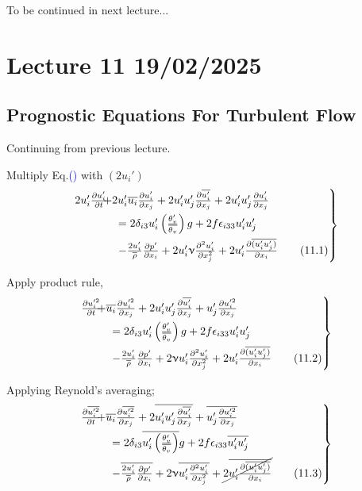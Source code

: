 \documentclass[fleqn,10pt]{SelfArx} %
\newcommand{\myeqref}[1]{Eq.\textcolor{blue}{\textup{(\getrefnumber{#1})}}}
\begin{document}
To be continued in next lecture...

\clearpage

\section{Lecture 11 19/02/2025}
\subsection{Prognostic Equations For Turbulent Flow}
Continuing from previous lecture.

Multiply \myeqref{eq:10.3} with \( (2u_i') \)
\begin{align*}
	\begin{rcases}
		2u_i'\frac{\partial u_i'}{\partial t} & \!\!\!\!\!\!\!\! + 2u_i'\overline{u_i}\frac{\partial u_i'}{\partial x_j} + 2u_i'u_j'\frac{\partial \overline{u_i'}}{\partial x_j} + 2u_i'u_j'\frac{\partial u_i'}{\partial x_j} \\ &= 2\delta_{i3}u_i'\left(\frac{\theta_v'}{\overline{\theta_v}}\right)g + 2f\epsilon_{i33}u_i'u_j' \\ &- \frac{2u_i'}{\overline{\rho}}\frac{\partial p'}{\partial x_i} + 2u_i'\upnu\frac{\partial^2 u_i'}{\partial x_j^2} + 2u_i'\frac{\partial \overline{(u_i'u_j')}}{\partial x_i} \tag{11.1} \label{eq:11.1}
	\end{rcases}
\end{align*}

Apply product rule,
\begin{align*}
	\begin{rcases}
		\frac{\partial u_i'^2}{\partial t} & \!\!\!\!\!\!\!\! + \overline{u_i}\frac{\partial u_i'^2}{\partial x_j} + 2u_i'u_j'\frac{\partial \overline{u_i'}}{\partial x_j} + u_j'\frac{\partial u_i'^2}{\partial x_j} \\ &= 2\delta_{i3}u_i'\left(\frac{\theta_v'}{\overline{\theta_v}}\right)g + 2f\epsilon_{i33}u_i'u_j' \\ &- \frac{2u_i'}{\overline{\rho}}\frac{\partial p'}{\partial x_i} + 2\upnu u_i'\frac{\partial^2 u_i'}{\partial x_j^2} + 2u_i'\frac{\partial \overline{(u_i'u_j')}}{\partial x_i} \tag{11.2} \label{eq:11.2}
	\end{rcases}
\end{align*}

Applying Reynold's averaging;
\begin{align*}
	\begin{rcases}
		\frac{\partial \overline{u_i'^2}}{\partial t} & \!\!\!\!\!\!\!\! + \overline{u_i}\frac{\partial \overline{u_i'^2}}{\partial x_j} + 2\overline{u_i'u_j'\frac{\partial \overline{u_i'}}{\partial x_j}} + \overline{u_j'\frac{\partial u_i'^2}{\partial x_j}} \\ &= 2\delta_{i3}\overline{u_i'\left(\frac{\theta_v'}{\overline{\theta_v}}\right)}g + 2f\epsilon_{i33}\overline{u_i'u_j'} \\ &- \overline{\frac{2u_i'}{\overline{\rho}}\frac{\partial p'}{\partial x_i}} + 2\upnu \overline{u_i'\frac{\partial^2 u_i'}{\partial x_j^2}} + \cancel{2\overline{u_i'\frac{\partial \overline{(u_i'u_j')}}{\partial x_i}}} \tag{11.3} \label{eq:11.3}
	\end{rcases}
\end{align*}
\end{document}
